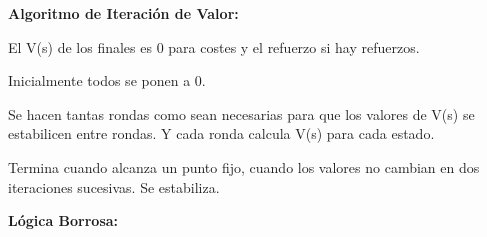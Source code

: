 \documentclass[12pt, twoside, openright]{report} %
\begin{document}
\begin{itemize}
\begin{itemize}
\begin{itemize}
\begin{itemize}
          
		  
            \textbf{Algoritmo de Iteración de Valor:}

			
            
			
              El V(s) de los finales es 0 para costes y el refuerzo si
              hay refuerzos.
             
			  
              Inicialmente todos se ponen a 0.
             
			  
              Se hacen tantas rondas como sean necesarias para que los
              valores de V(s) se estabilicen entre rondas. Y cada ronda
              calcula V(s) para cada estado.
              
			  
              Termina cuando alcanza un punto fijo, cuando los valores
              no cambian en dos iteraciones sucesivas. Se estabiliza.
            
			  
        \end{itemize}
      \end{itemize}
    \end{itemize}
  \end{itemize}

 
  \textbf{Lógica Borrosa:}
  
\end{document}
